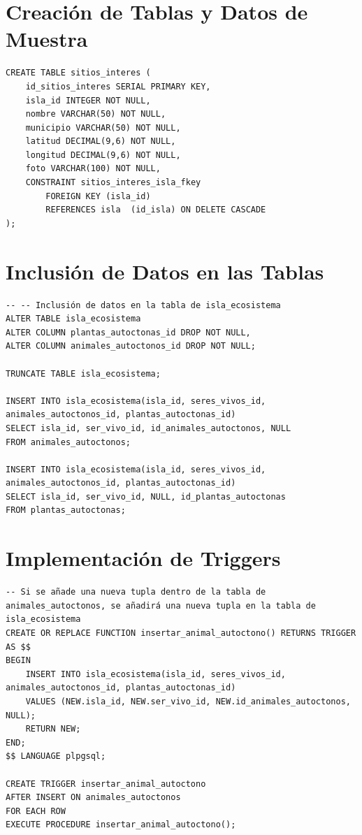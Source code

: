 \documentclass[11pt]{report}
\begin{document}
\section{Creación de Tablas y Datos de Muestra}
\begin{verbatim}
CREATE TABLE sitios_interes (
    id_sitios_interes SERIAL PRIMARY KEY,
    isla_id INTEGER NOT NULL,
    nombre VARCHAR(50) NOT NULL,
    municipio VARCHAR(50) NOT NULL,
    latitud DECIMAL(9,6) NOT NULL,
    longitud DECIMAL(9,6) NOT NULL,
    foto VARCHAR(100) NOT NULL,
    CONSTRAINT sitios_interes_isla_fkey
        FOREIGN KEY (isla_id)
        REFERENCES isla  (id_isla) ON DELETE CASCADE
);
\end{verbatim}

\section{Inclusión de Datos en las Tablas}
\begin{verbatim}
-- -- Inclusión de datos en la tabla de isla_ecosistema
ALTER TABLE isla_ecosistema
ALTER COLUMN plantas_autoctonas_id DROP NOT NULL,
ALTER COLUMN animales_autoctonos_id DROP NOT NULL;

TRUNCATE TABLE isla_ecosistema;

INSERT INTO isla_ecosistema(isla_id, seres_vivos_id, animales_autoctonos_id, plantas_autoctonas_id)
SELECT isla_id, ser_vivo_id, id_animales_autoctonos, NULL
FROM animales_autoctonos;

INSERT INTO isla_ecosistema(isla_id, seres_vivos_id, animales_autoctonos_id, plantas_autoctonas_id)
SELECT isla_id, ser_vivo_id, NULL, id_plantas_autoctonas
FROM plantas_autoctonas;
\end{verbatim}

\section{Implementación de Triggers}
\begin{verbatim}
-- Si se añade una nueva tupla dentro de la tabla de animales_autoctonos, se añadirá una nueva tupla en la tabla de isla_ecosistema
CREATE OR REPLACE FUNCTION insertar_animal_autoctono() RETURNS TRIGGER AS $$
BEGIN
    INSERT INTO isla_ecosistema(isla_id, seres_vivos_id, animales_autoctonos_id, plantas_autoctonas_id)
    VALUES (NEW.isla_id, NEW.ser_vivo_id, NEW.id_animales_autoctonos, NULL);
    RETURN NEW;
END;
$$ LANGUAGE plpgsql;

CREATE TRIGGER insertar_animal_autoctono
AFTER INSERT ON animales_autoctonos
FOR EACH ROW
EXECUTE PROCEDURE insertar_animal_autoctono();
\end{verbatim}
\end{document}
